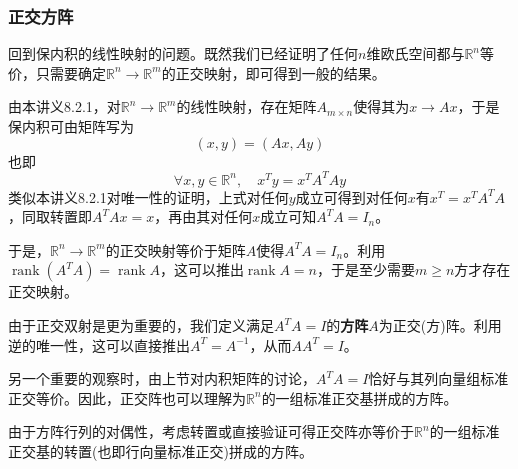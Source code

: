 \documentclass[a4paper,UTF8,fontset=windows]{ctexart}
\DeclareMathOperator{\rank}{rank}
\newcommand*{\note}{\noindent *}
\begin{document}
\subsubsection{正交方阵}
回到保内积的线性映射的问题。既然我们已经证明了任何$n$维欧氏空间都与$\mathbb{R}^n$等价，只需要确定$\mathbb{R}^n\to\mathbb{R}^m$的正交映射，即可得到一般的结果。

由本讲义8.2.1，对$\mathbb{R}^n\to\mathbb{R}^m$的线性映射，存在矩阵$A_{m\times n}$使得其为$x\to Ax$，于是保内积可由矩阵写为
$$(x,y)=(Ax,Ay)$$
也即
$$\forall x,y\in\mathbb{R}^n,\quad x^Ty=x^TA^TAy$$
类似本讲义8.2.1对唯一性的证明，上式对任何$y$成立可得到对任何$x$有$x^T=x^TA^TA$，同取转置即$A^TAx=x$，再由其对任何$x$成立可知$A^TA=I_n$。

于是，$\mathbb{R}^n\to\mathbb{R}^m$的正交映射等价于矩阵$A$使得$A^TA=I_n$。利用$\rank(A^TA)=\rank A$，这可以推出$\rank A=n$，于是至少需要$m\ge n$方才存在正交映射。

由于正交双射是更为重要的，我们定义满足$A^TA=I$的\textbf{方阵}$A$为正交(方)阵。利用逆的唯一性，这可以直接推出$A^T=A^{-1}$，从而$AA^T=I$。

另一个重要的观察时，由上节对内积矩阵的讨论，$A^TA=I$恰好与其列向量组标准正交等价。因此，正交阵也可以理解为$\mathbb{R}^n$的一组标准正交基拼成的方阵。

\note 由于方阵行列的对偶性，考虑转置或直接验证可得正交阵亦等价于$\mathbb{R}^n$的一组标准正交基的转置(也即行向量标准正交)拼成的方阵。

\
\end{document}
